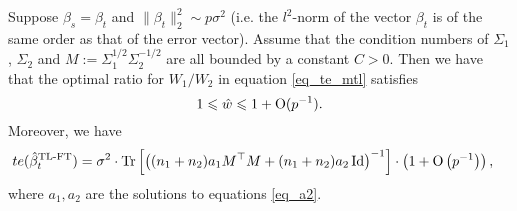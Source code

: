 \begin{proposition}\label{thm_cov_shift}
Suppose $\beta_s = \beta_t$ and $\|\beta_t\|_2^2\sim p\sigma^2$ (i.e. the $l^2$-norm of the vector $\beta_t$ is of the same order as that of the error vector). Assume that the condition numbers of $\Sigma_1$, $\Sigma_2$ and $M:=\Sigma_1^{1/2}\Sigma_2^{-1/2}$ are all bounded by a constant $C>0$. Then we have that the optimal ratio for $W_1/W_2$ in equation \eqref{eq_te_mtl} satisfies
	$$1\leqslant \hat{w} \leqslant 1+\operatorname{O}(p^{-1}).$$%
Moreover, we have
	\begin{align}\label{tehatw1}
		te(\hat{\beta}^{\text{TL-FT}}_{t}) &= \sigma^2 \cdot \operatorname{Tr}\left[\left({(n_1 + n_2)a_1 M^\top M  + (n_1 + n_2)a_2\operatorname{Id}}\right)^{-1}\right] \cdot \left(1+ \operatorname{O}\left(p^{-1}\right)\right),
	\end{align}
where $a_1, a_2$ are the solutions to equations \eqref{eq_a2}. %
\end{proposition}


